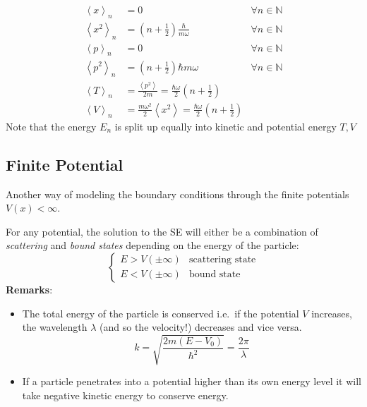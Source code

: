 \noindent\begin{align*}
    \left\langle x \right\rangle _n   & = 0                                                                                                    & \forall n \in \mathbb{N} \\
    \left\langle x^2 \right\rangle _n & = \left(n+\frac{1}{2}\right)\frac{\hbar}{m\omega}                                                      & \forall n \in \mathbb{N} \\
    \left\langle p \right\rangle _n   & = 0                                                                                                    & \forall n \in \mathbb{N} \\
    \left\langle p^2 \right\rangle _n & = \left(n+\frac{1}{2}\right)\hbar m\omega                                                              & \forall n \in \mathbb{N} \\
    \left\langle T \right\rangle _n   & = \frac{\left\langle p^2 \right\rangle}{2m} =  \frac{\hbar \omega}{2}\left(n+\frac{1}{2}\right)                                   \\
    \left\langle V \right\rangle _n   & = \frac{m\omega^2}{2}\left\langle x^2 \right\rangle = \frac{\hbar \omega}{2}\left(n+\frac{1}{2}\right)
\end{align*}
Note that the energy $E_n$ is split up equally into kinetic and potential energy $T,V$

\subsection{Finite Potential}
Another way of modeling the boundary conditions through the finite potentials $V(x) < \infty$.

For any potential, the solution to the SE will either be a combination of \textit{scattering} and \textit{bound states} depending on the energy of the particle:
\noindent\begin{equation*}
    \begin{cases}
        E > V(\pm \infty) & \text{scattering state} \\
        E < V(\pm \infty) & \text{bound state}
    \end{cases}
\end{equation*}
\textbf{Remarks}:

\begin{itemize}
    \item The total energy of the particle is conserved i.e.\ if the potential $V$ increases, the wavelength $\lambda$ (and so the velocity!) decreases and vice versa.
          \noindent\begin{equation*}
              k=\sqrt{\frac{2m(E-V_0)}{\hbar^2}} = \frac{2\pi}{\lambda}
          \end{equation*}
    \item If a particle penetrates into a potential higher than its own energy level it will take negative kinetic energy to conserve energy.
\end{itemize}


